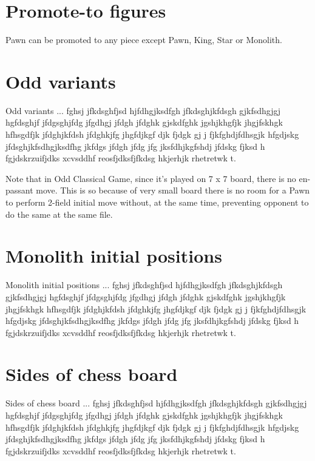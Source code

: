 
\section*{Promote-to figures}

Pawn can be promoted to any piece except Pawn, King, Star or Monolith.

\section*{Odd variants}

Odd variants ... fghsj jfkdsghfjsd hjfdhgjksdfgh jfkdsghjkfdsgh gjkfsdhgjgj
hgfdsghjf jfdgsghjfdg jfgdhgj jfdgh jfdghk gjskdfghk jgshjkhgfjk jhgjfskhgk
hfhsgdfjk jfdghjkfdsh jfdghkjfg jhgfdjkgf djk fjdgk gj j fjkfghdjfdhsgjk
hfgdjskg jfdsghjkfsdhgjksdfhg jkfdgs jfdgh jfdg jfg jksfdhjkgfshdj jfdskg
fjksd h fgjdskrzuifjdks xcvsddhf reosfjdksfjfkdsg hkjerhjk rhetretwk t.

Note that in Odd Classical Game, since it's played on 7 x 7 board,
there is no en-passant move. This is so because of very small board
there is no room for a Pawn to perform 2-field initial move without,
at the same time, preventing opponent to do the same at the same file.

\section*{Monolith initial positions}

Monolith initial positions ... fghsj jfkdsghfjsd hjfdhgjksdfgh jfkdsghjkfdsgh gjkfsdhgjgj
hgfdsghjf jfdgsghjfdg jfgdhgj jfdgh jfdghk gjskdfghk jgshjkhgfjk jhgjfskhgk
hfhsgdfjk jfdghjkfdsh jfdghkjfg jhgfdjkgf djk fjdgk gj j fjkfghdjfdhsgjk
hfgdjskg jfdsghjkfsdhgjksdfhg jkfdgs jfdgh jfdg jfg jksfdhjkgfshdj jfdskg
fjksd h fgjdskrzuifjdks xcvsddhf reosfjdksfjfkdsg hkjerhjk rhetretwk t.

\section*{Sides of chess board}

Sides of chess board ... fghsj jfkdsghfjsd hjfdhgjksdfgh jfkdsghjkfdsgh gjkfsdhgjgj
hgfdsghjf jfdgsghjfdg jfgdhgj jfdgh jfdghk gjskdfghk jgshjkhgfjk jhgjfskhgk
hfhsgdfjk jfdghjkfdsh jfdghkjfg jhgfdjkgf djk fjdgk gj j fjkfghdjfdhsgjk
hfgdjskg jfdsghjkfsdhgjksdfhg jkfdgs jfdgh jfdg jfg jksfdhjkgfshdj jfdskg
fjksd h fgjdskrzuifjdks xcvsddhf reosfjdksfjfkdsg hkjerhjk rhetretwk t.

